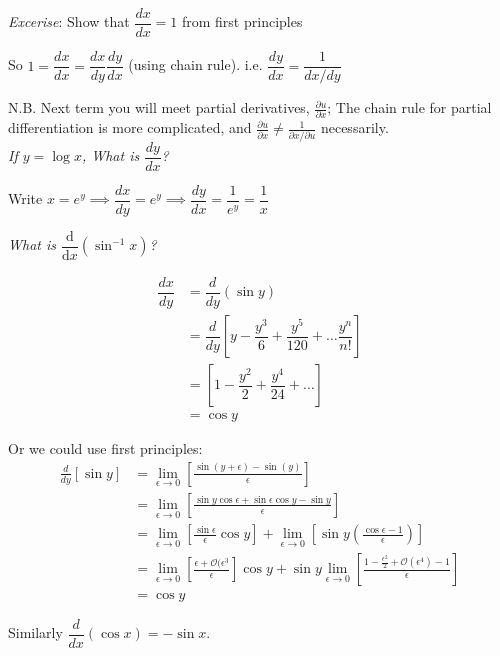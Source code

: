 \documentclass[twoside]{scrartcl}
\begin{document}
\emph{Excerise}: Show that $\dfrac{dx}{dx} = 1$ from first principles

So $1 = \dfrac{dx}{dx} = \dfrac{dx}{dy}\dfrac{dy}{dx}$ (using chain rule). i.e. $\boxed{\dfrac{dy}{dx} = \dfrac{1}{dx/dy}}$


N.B. Next term you will meet partial derivatives, $\frac{\partial u}{\partial x}$; The chain rule for partial differentiation is more complicated, and $\frac{\partial u}{\partial x} \neq \frac{1}{\partial x / \partial u}$ necessarily.\\


\textit{If $y = \log x$, What is $\dfrac{dy}{dx}$?}

Write $x = e^y \implies \dfrac{dx}{dy} = e^y \implies \dfrac{dy}{dx} = \dfrac{1}{e^y} = \dfrac{1}{x}$\\


\textit{What is $\dfrac{\mathrm{d}}{\mathrm{d}x} (\sin^{-1} x)$?}

\[
\begin{aligned}
  \dfrac{dx}{dy} &= \dfrac{d}{dy}(\sin y) \\
&= \dfrac{d}{dy}
\left[y - \dfrac{y^3}{6} + \dfrac{y^5}{120} + \dots \dfrac{y^n}{n!}\right] \\
&= \left[1 - \dfrac{y^2}{2} + \dfrac{y^4}{24} + \dots\right]\\
&= \cos y
\end{aligned}
\]

Or we could use first principles:
\begin{align*} \nonumber \frac{d}{dy}[\sin y] 
&= \lim_{\epsilon \to 0}
\left[\frac{\sin(y+\epsilon) - \sin(y)}{\epsilon} \right]\\
&=\lim_{\epsilon \to 0}
 \left[\frac{\sin y \cos \epsilon + \sin \epsilon \cos y - \sin y}{\epsilon} \right] 
 \\ \nonumber
&= \lim_{\epsilon \to 0}
\left[\frac{\sin \epsilon}{\epsilon}\cos y\right]
+ \lim_{\epsilon \to 0}
\left[\sin y \left(\frac{\cos \epsilon -1}{\epsilon} \right) \right]
\\ \nonumber
&=\lim_{\epsilon \to 0}
\left[\frac{\epsilon + \mathcal{O}(\epsilon^3}{\epsilon} \right]\cos y
+ \sin y \lim_{\epsilon \to 0}
\left[\frac{1-\frac{\epsilon^2}{2} + \mathcal{O}(\epsilon^4) -1}{\epsilon}\right]
\\ \nonumber
&= \cos y
\end{align*}


Similarly $\dfrac{d}{dx}(\cos x) = -\sin x$. 
\end{document}
